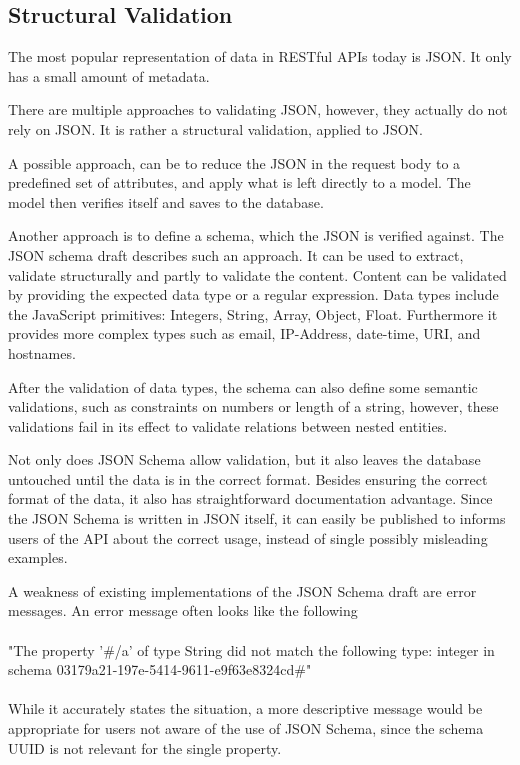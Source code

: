 \subsection{Structural Validation}

The most popular representation of data in RESTful APIs today is JSON. It only
has a small amount of metadata.

There are multiple approaches to validating JSON, however, they actually do not
rely on JSON. It is rather a structural validation, applied to JSON.

A possible approach, can be to reduce the JSON in the request body to a
predefined set of attributes, and apply what is left directly to a model. The
model then verifies itself and saves to the database.

Another approach is to define a schema, which the JSON is verified against. The
JSON schema draft describes such an approach. It can be used to extract,
validate structurally and partly to validate the content. Content can be
validated by providing the expected data type or a regular expression. Data types
include the JavaScript primitives: Integers, String, Array, Object, Float.
Furthermore it provides more complex types such as email, IP-Address,
date-time, URI, and hostnames.

After the validation of data types, the schema can also define some semantic
validations, such as constraints on numbers or length of a string, however,
these validations fail in its effect to validate relations between nested
entities.

Not only does JSON Schema allow validation, but it also leaves the database
untouched until the data is in the correct format. Besides ensuring the correct
format of the data, it also has straightforward documentation advantage. Since
the JSON Schema is written in JSON itself, it can easily be published to
informs users of the API about the correct usage, instead of single possibly
misleading examples.

A weakness of existing implementations of the JSON Schema draft are error
messages. An error message often looks like the following

\paragraph{}{"The property '\#/a' of type String did not match the following type: integer in
schema 03179a21-197e-5414-9611-e9f63e8324cd\#"}

\paragraph{}{While it accurately states the situation, a more descriptive message would be
appropriate for users not aware of the use of JSON Schema, since the schema
UUID is not relevant for the single property.}

